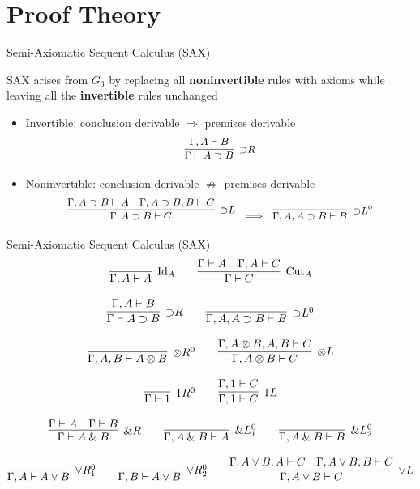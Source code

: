 \documentclass[9ps]{beamer}
\begin{document}
\section{Proof Theory}
\begin{frame}{Semi-Axiomatic Sequent Calculus (SAX)}
\small
  
SAX arises from $G_3$ by replacing all \textbf{noninvertible} rules with axioms
while leaving all the \textbf{invertible} rules unchanged
\begin{itemize}
  \item Invertible: conclusion derivable $\Rightarrow$ premises derivable 
    \[ \small
      \infer[{\supset}R]{\Gamma \vdash A \supset B}{
        \Gamma, A \vdash B
      }
    \]
  \item Noninvertible: conclusion derivable $\not\Rightarrow$ premises derivable 
    \[ \small
      \infer[{\supset}L]{\Gamma, A \supset B \vdash C}{
        \Gamma, A \supset B \vdash A \quad
        \Gamma, A \supset B, B \vdash C
      }
      \;\;\Longrightarrow\;\;
      \infer[{\supset}L^0]{\Gamma, A, A \supset B \vdash B}{}
    \]
\end{itemize}  
\end{frame}


\begin{frame}{Semi-Axiomatic Sequent Calculus (SAX)}  
\scriptsize
\[
  \infer[\text{Id}_A]{\Gamma, A \vdash A}{}
  \qquad
  \infer[\text{Cut}_A]{\Gamma \vdash C}{
    \Gamma \vdash A &
    \Gamma, A \vdash C
  }
\]

\[
  \infer[{\supset}R]{\Gamma \vdash A \supset B}{
    \Gamma, A \vdash B
  }
  \qquad
  \infer[{\supset}L^0]{\Gamma, A, A \supset B \vdash B}{}
\]

\[
  \infer[{\otimes}R^0]{\Gamma, A, B \vdash A \otimes B}{}
  \qquad
  \infer[{\otimes}L]{\Gamma, A \otimes B \vdash C}{
    \Gamma, A \otimes B, A, B \vdash C
  }
\]

\[
  \infer[1R^0]{\Gamma \vdash 1}{}
  \qquad
  \infer[1L]{\Gamma, 1 \vdash C}{
    \Gamma, 1 \vdash C
  }
\]

\[
  \infer[{\&}R]{\Gamma \vdash A \mathbin{\&} B}{
    \Gamma \vdash A &
    \Gamma \vdash B
  }
  \qquad
  \infer[{\&}L_1^0]{\Gamma, A \mathbin{\&} B \vdash A}{}
  \qquad
  \infer[{\&}L_2^0]{\Gamma, A \mathbin{\&} B \vdash B}{}
\]

\[
  \infer[{\lor}R_1^0]{\Gamma, A \vdash A \vee B}{}
  \qquad
  \infer[{\lor}R_2^0]{\Gamma, B \vdash A \vee B}{}
  \qquad
  \infer[{\lor}L]{\Gamma, A \vee B \vdash C}{
    \Gamma, A \vee B, A \vdash C &
    \Gamma, A \vee B, B \vdash C
  }
\]
\end{frame}
\end{document}
